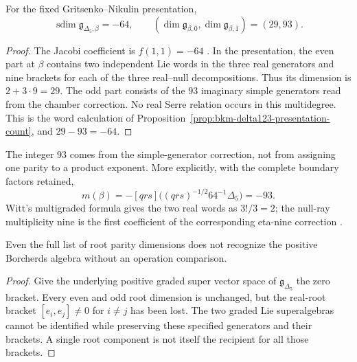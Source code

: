 \begin{lemma}
\label{lem:appE-first-timelike-parity}
For the fixed Gritsenko--Nikulin presentation,
\[
 \operatorname{sdim}\mathfrak g_{\Delta_5,\beta}=-64,
 \qquad
 (\dim\mathfrak g_{\beta,\bar0},\dim\mathfrak g_{\beta,\bar1})
       =(29,93).
\]
\end{lemma}
\begin{proof}
The Jacobi coefficient is \(f(1,1)=-64\)
\cite{EZ:1}. In the presentation, the even part at \(\beta\)
contains two independent Lie words in the three real generators and nine
brackets for each of the three real--null decompositions. Thus its
 dimension is \(2+3\cdot9=29\). The odd part consists of the
\(93\) imaginary simple generators read from the chamber
correction. No real Serre relation occurs in this multidegree.
This is the word calculation of
Proposition~\ref{prop:bkm-delta123-presentation-count}, and
\(29-93=-64\).
\end{proof}

The integer \(93\) comes from the simple-generator correction, not
from assigning one parity to a product exponent. More explicitly,
with the complete boundary factors retained,
\[
 m(\beta)=-[qrs]\bigl((qrs)^{-1/2}64^{-1}\Delta_5\bigr)=-93.
\]
Witt's multigraded formula gives the two real words as
\(3!/3=2\); the null-ray multiplicity nine is the first coefficient
of the corresponding eta-nine correction \cite{GN,GNII}.

\begin{corollary}
\label{cor:appE-signed-not-recognition}
Even the full list of root parity dimensions does not recognize the
positive Borcherds algebra without an operation comparison.
\end{corollary}
\begin{proof}
Give the underlying positive graded super vector space of
\(\mathfrak g_{\Delta_5}\) the zero bracket. Every even and odd
root dimension is unchanged, but the real-root bracket
\([e_i,e_j]\ne0\) for \(i\ne j\) has been lost. The two graded
Lie superalgebras cannot be identified while preserving these
specified generators and their brackets. A single root component
is not itself the recipient for all those brackets.
\end{proof}

